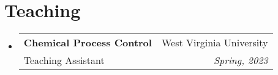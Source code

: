 \documentclass[letterpaper,11pt]{article}
\makeatletter
\newcommand{\resumeTeachingHeading}[4]{
	 \vspace{-2pt}\item
	\begin{tabular*}{0.97\textwidth}[t]{l@{\extracolsep{\fill}}r}
		\textbf{#1} & #2 \\
		{#3} & \textit{\small #4} \\
	\end{tabular*}\vspace{-7pt}
}
\newcommand{\resumeOrganizationHeading}[4]{
  \vspace{-2pt}\item
    \begin{tabular*}{0.97\textwidth}[t]{l@{\extracolsep{\fill}}r}
      \textbf{#1} & \textit{\small #2} \\
      \textit{\small#3}
    \end{tabular*}\vspace{-7pt}
}
\newcommand{\resumeSubHeadingListStart}{\begin{itemize}[leftmargin=0.15in, label={}]}
\newcommand{\resumeSubHeadingListEnd}{\end{itemize}}
\makeatother
\begin{document}
  \section{Teaching}
  \vspace{3pt}
  \resumeSubHeadingListStart
  \resumeTeachingHeading{Chemical Process Control}{West Virginia University}{Teaching Assistant}{Spring, 2023}
  
\resumeSubHeadingListEnd


    
    




    
    








    



\end{document}
